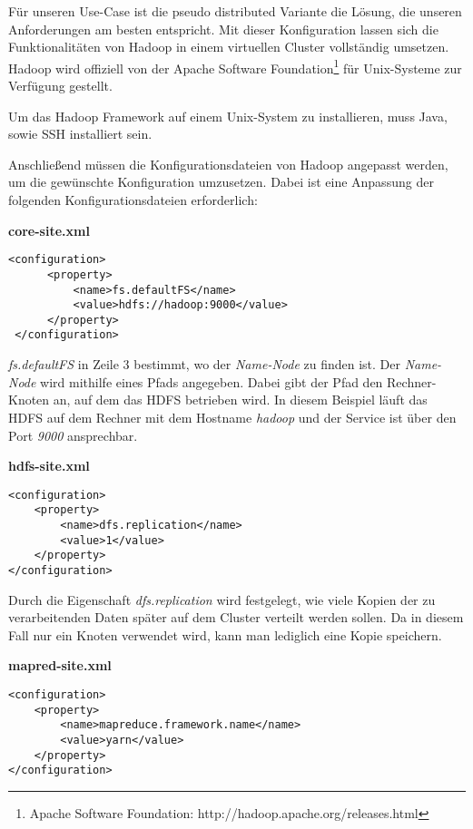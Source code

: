 Für unseren Use-Case ist die pseudo distributed Variante die Lösung, die unseren Anforderungen am besten entspricht. Mit dieser Konfiguration lassen sich die Funktionalitäten von Hadoop in einem virtuellen Cluster vollständig umsetzen. Hadoop wird offiziell von der Apache Software Foundation\footnote{Apache Software Foundation: http://hadoop.apache.org/releases.html} für Unix-Systeme zur Verfügung gestellt.


Um das Hadoop Framework auf einem Unix-System zu installieren, muss Java, sowie SSH installiert sein.

Anschließend müssen die Konfigurationsdateien von Hadoop angepasst werden, um die gewünschte Konfiguration umzusetzen. Dabei ist eine Anpassung der folgenden Konfigurationsdateien erforderlich:

\textbf{core-site.xml}

\lstset{language=XML}

\begin{lstlisting}
<configuration>
      <property>
          <name>fs.defaultFS</name>
          <value>hdfs://hadoop:9000</value>
      </property>
 </configuration>
\end{lstlisting}

\textit{fs.defaultFS} in Zeile 3 bestimmt, wo der \textit{Name-Node} zu finden ist. Der \textit{Name-Node} wird mithilfe eines Pfads angegeben. Dabei gibt der Pfad den Rechner-Knoten an, auf dem das HDFS betrieben wird. In diesem Beispiel läuft das HDFS auf dem Rechner mit dem Hostname \textit{hadoop} und der Service ist über den Port \textit{9000} ansprechbar. 

\pagebreak

\textbf{hdfs-site.xml}

\lstset{language=XML}

\begin{lstlisting}
<configuration>
    <property>
        <name>dfs.replication</name>
        <value>1</value>
    </property>
</configuration>
\end{lstlisting}


Durch die Eigenschaft \textit{dfs.replication} wird festgelegt, wie viele Kopien der zu verarbeitenden Daten später auf dem Cluster verteilt werden sollen. Da in diesem Fall nur ein Knoten verwendet wird, kann man lediglich eine Kopie speichern.

\textbf{mapred-site.xml}

\lstset{language=XML}

\begin{lstlisting}
<configuration>
    <property>
        <name>mapreduce.framework.name</name>
        <value>yarn</value>
    </property>
</configuration>
\end{lstlisting}

